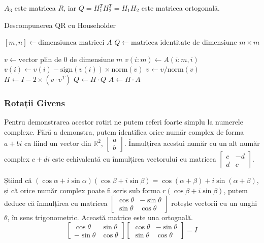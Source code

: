 \documentclass{exam}
\begin{document}
$A_3$ este matricea $R$, iar $Q = H_1^T H_2^T = H_1 H_2$ este matricea
ortogonală.

\begin{algorithm}
	\caption{Descompunerea QR cu Householder}
	\begin{algorithmic}[1]
		\State \( [m, n] \gets \text{dimensiunea matricei } A \)
		\State \( Q \gets \text{matricea identitate de dimensiune } m \times m \)

		\State \( v \gets \text{vector plin de 0 de dimensiune } m \)
		\State \( v(i:m) \gets A(i:m, i) \)
		\State \( v(i) \gets v(i) - \text{sign}(v(i)) \times \text{norm}(v) \)
		\State \( v \gets v / \text{norm}(v) \)
		\State \( H \gets I - 2 \times (v \cdot v^T) \)
		\State \( Q \gets H \cdot Q \)
		\State \( A \gets H \cdot A \)
		\EndFor
	\end{algorithmic}
\end{algorithm}

\subsubsection{Rotații Givens}

Pentru demonstrarea acestor rotiri ne putem referi foarte simplu la numerele
complexe. Fără a demonstra, putem identifica orice număr complex de forma $a + bi$
ca fiind un vector din $\mathbb{R}^2$, $\begin{bmatrix} a \\ b \end{bmatrix}$.
Înmulțirea acestui număr cu un alt număr complex $c + di$ este echivalentă cu
înmulțirea vectorului cu matricea $\begin{bmatrix} c & -d \\ d & c \end{bmatrix}$.

Știind că $ (\cos \alpha + i \sin \alpha)(\cos \beta + i \sin \beta) = \cos(\alpha + \beta) + i \sin(\alpha + \beta)$,
și că orice număr complex poate fi scris sub forma $r(\cos \beta + i \sin \beta)$,
putem deduce că înmulțirea cu matricea $\begin{bmatrix} \cos \theta & -\sin \theta \\ \sin \theta & \cos \theta \end{bmatrix}$
rotește vectorii cu un unghi $\theta$, în sens trigonometric. Această matrice
este una ortognală.
\begin{equation*}
	\begin{bmatrix} \cos \theta & \sin \theta \\ -\sin \theta & \cos \theta \end{bmatrix} \begin{bmatrix} \cos \theta & -\sin \theta \\ \sin \theta & \cos \theta \end{bmatrix} = I
\end{equation*}
\end{document}

